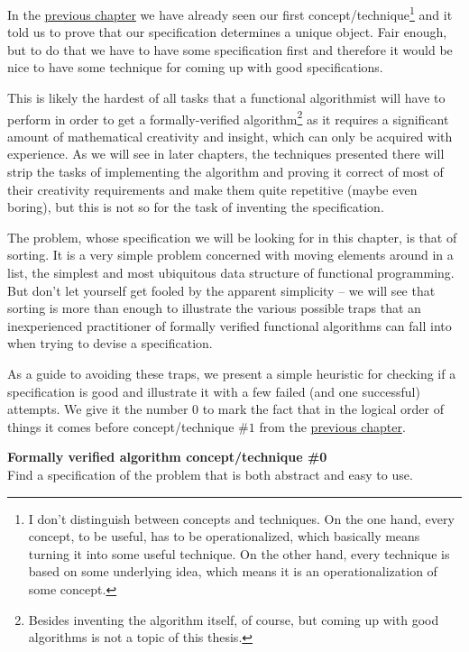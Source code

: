 \documentclass[declaration,mgr,english,shortabstract]{iithesis}
\begin{document}
In the \hyperref[introduction]{previous chapter} we have already seen our first concept/technique\footnote{I don't distinguish between concepts and techniques. On the one hand, every concept, to be useful, has to be operationalized, which basically means turning it into some useful technique. On the other hand, every technique is based on some underlying idea, which means it is an operationalization of some concept.} and it told us to prove that our specification determines a unique object. Fair enough, but to do that we have to have some specification first and therefore it would be nice to have some technique for coming up with good specifications.

This is likely the hardest of all tasks that a functional algorithmist will have to perform in order to get a formally-verified algorithm\footnote{Besides inventing the algorithm itself, of course, but coming up with good algorithms is not a topic of this thesis.} as it requires a significant amount of mathematical creativity and insight, which can only be acquired with experience. As we will see in later chapters, the techniques presented there will strip the tasks of implementing the algorithm and proving it correct of most of their creativity requirements and make them quite repetitive (maybe even boring), but this is not so for the task of inventing the specification.

The problem, whose specification we will be looking for in this chapter, is that of sorting. It is a very simple problem concerned with moving elements around in a list, the simplest and most ubiquitous data structure of functional programming. But don't let yourself get fooled by the apparent simplicity -- we will see that sorting is more than enough to illustrate the various possible traps that an inexperienced practitioner of formally verified functional algorithms can fall into when trying to devise a specification.

As a guide to avoiding these traps, we present a simple heuristic for checking if a specification is good and illustrate it with a few failed (and one successful) attempts. We give it the number $0$ to mark the fact that in the logical order of things it comes before concept/technique $\#1$ from the \hyperref[introduction]{previous chapter}.

\begin{center}
    \textbf{Formally verified algorithm concept/technique \#0} \\
    Find a specification of the problem that is both abstract and easy to use.
\end{center}
\end{document}
